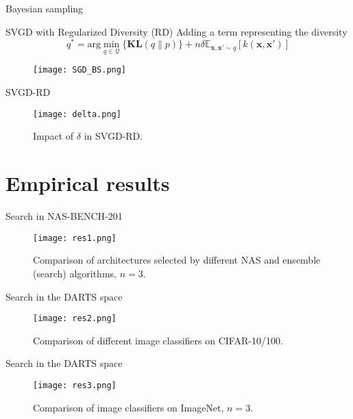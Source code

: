 \documentclass{beamer}
\def\*#1{\mathbf{#1}}
\begin{document}
\begin{frame}{Bayesian sampling}

\begin{block}{SVGD with Regularized Diversity (RD)}
    Adding a term representing the diversity
    \[q^* = \text{arg}\min\limits_{q \in \mathcal{Q} } \{\*{KL}(q\| p)\} + n\delta \mathbb{E}_{\textbf{x}, \textbf{x}' \sim q} [k(\textbf{x}, \textbf{x}')] \]
\end{block}

\begin{figure}
    \centering
    \texttt{[image: SGD\_BS.png]}
    \label{fig:svgdbs}
\end{figure}

\end{frame}

\begin{frame}{SVGD-RD}

\begin{figure}
    \centering
    \texttt{[image: delta.png]}
    \caption{Impact of $\delta$ in SVGD-RD.}
    \label{fig:delta}
\end{figure}

\end{frame}


\section{Empirical results}
\begin{frame}{Search in NAS-BENCH-201}

\begin{figure}
    \centering
    \texttt{[image: res1.png]}
    \caption{Comparison of architectures selected by different NAS and ensemble (search) algorithms, $n=3$.}
    \label{fig:res1}
\end{figure}
\end{frame}

\begin{frame}{Search in the DARTS space}

\begin{figure}
    \centering
    \texttt{[image: res2.png]}
    \caption{Comparison of different image classifiers on CIFAR-10/100.}
    \label{fig:res2}
\end{figure}

\end{frame}

\begin{frame}{Search in the DARTS space}

\begin{figure}
    \centering
    \texttt{[image: res3.png]}
    \caption{Comparison of image classifiers on ImageNet, $n=3$.}
    \label{fig:res3}
\end{figure}

\end{frame}
\end{document}
